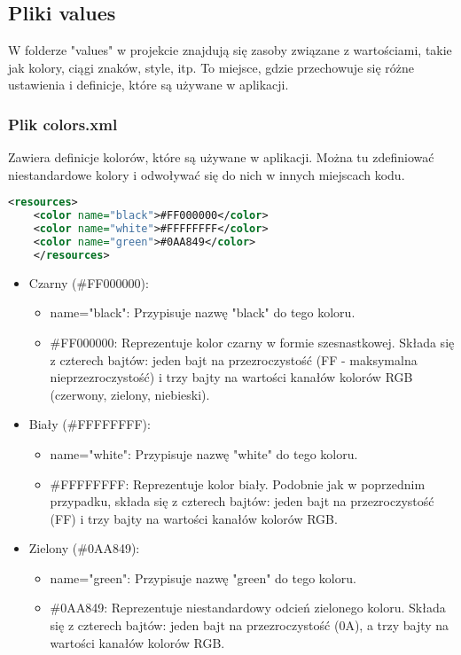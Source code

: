 \subsection{Pliki values}
W folderze "values" w projekcie znajdują się zasoby związane z wartościami, takie jak kolory, ciągi znaków, style, itp. To miejsce, gdzie przechowuje się różne ustawienia i definicje, które są używane w aplikacji. 
\subsubsection{Plik colors.xml}
\hspace{0.60 cm}Zawiera definicje kolorów, które są używane w aplikacji. Można tu zdefiniować niestandardowe kolory i odwoływać się do nich w innych miejscach kodu.
\begin{lstlisting}[caption=colors.xml, label={lst:kod.xml}, language=XML]
	<resources>
	<color name="black">#FF000000</color>
	<color name="white">#FFFFFFFF</color>
	<color name="green">#0AA849</color>
	</resources>
\end{lstlisting}
\begin{itemize}
	\item Czarny (\#FF000000):
	\begin{itemize}
		\item name="black": Przypisuje nazwę "black" do tego koloru.
		\item \#FF000000: Reprezentuje kolor czarny w formie szesnastkowej. Składa się z czterech bajtów: jeden bajt na przezroczystość (FF - maksymalna nieprzezroczystość) i trzy bajty na wartości kanałów kolorów RGB (czerwony, zielony, niebieski).
	\end{itemize}
	\item Biały (\#FFFFFFFF):
	\begin{itemize}
		\item name="white": Przypisuje nazwę "white" do tego koloru.
		\item \#FFFFFFFF: Reprezentuje kolor biały. Podobnie jak w poprzednim przypadku, składa się z czterech bajtów: jeden bajt na przezroczystość (FF) i trzy bajty na wartości kanałów kolorów RGB.
	\end{itemize}
	\item Zielony (\#0AA849):
	\begin{itemize}
		\item name="green": Przypisuje nazwę "green" do tego koloru.
		\item \#0AA849: Reprezentuje niestandardowy odcień zielonego koloru. Składa się z czterech bajtów: jeden bajt na przezroczystość (0A), a trzy bajty na wartości kanałów kolorów RGB.
	\end{itemize}
\end{itemize}
